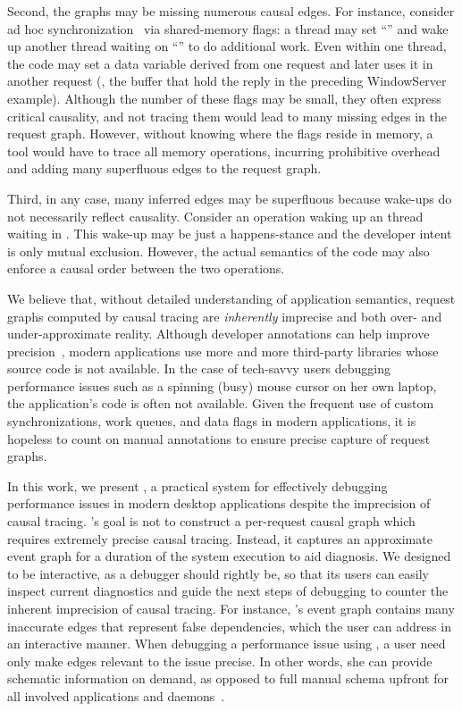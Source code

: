 Second, the graphs may be missing numerous causal edges.  For instance,
consider ad hoc synchronization~\cite{xiong2010ad} via shared-memory flags: a
thread may set ``'' and wake up another thread waiting on
``'' to do additional work.  Even within one thread, the code
may set a data variable derived from one request and later uses it in another
request (\eg, the buffer that hold the reply in the preceding WindowServer
example). Although the number of these flags may be small, they often express
critical causality, and not tracing them would lead to many missing edges in
the request graph.  However, without knowing where the flags reside in memory,
a tool would have to trace all memory operations, incurring prohibitive
overhead and adding many superfluous edges to the request graph.

Third, in any case, many inferred edges may be superfluous because wake-ups do
not necessarily reflect causality.  Consider an  operation waking
up an thread waiting in .  This wake-up may be just a happens-stance
and the developer intent is only mutual exclusion.  However, the actual
semantics of the code may also enforce a causal order between the two
operations.

We believe that, without detailed understanding of application semantics,
request graphs computed by causal tracing are \emph{inherently} imprecise and
both over- and under-approximate reality.  Although developer annotations can
help improve precision~\cite{barham2004using, reynolds2006pip}, modern
applications use more and more third-party libraries whose source code is not
available.  In the case of tech-savvy users debugging performance issues such
as a spinning (busy) mouse cursor on her own laptop, the application's code is
often not available.  Given the frequent use of custom synchronizations, work
queues, and data flags in modern applications, it is hopeless to count on
manual annotations to ensure precise capture of request graphs.

In this work, we present \xxx, a practical system for effectively debugging
performance issues in modern desktop applications despite the imprecision of
causal tracing.  \xxx's goal is not to construct a per-request causal graph
which requires extremely precise causal tracing.  Instead, it captures an
approximate event graph for a duration of the system execution to aid
diagnosis.  We designed \xxx to be interactive, as a debugger should rightly
be, so that its users can easily inspect current diagnostics and guide the next
steps of debugging to counter the inherent imprecision of causal tracing. For
instance, \xxx's event graph contains many inaccurate edges that represent
false dependencies, which the user can address in an interactive manner.  When
debugging a performance issue using \xxx, a user need only make edges relevant
to the issue precise.  In other words, she can provide schematic information on
demand, as opposed to full manual schema upfront for all involved applications
and daemons~\cite{barham2004using}.

